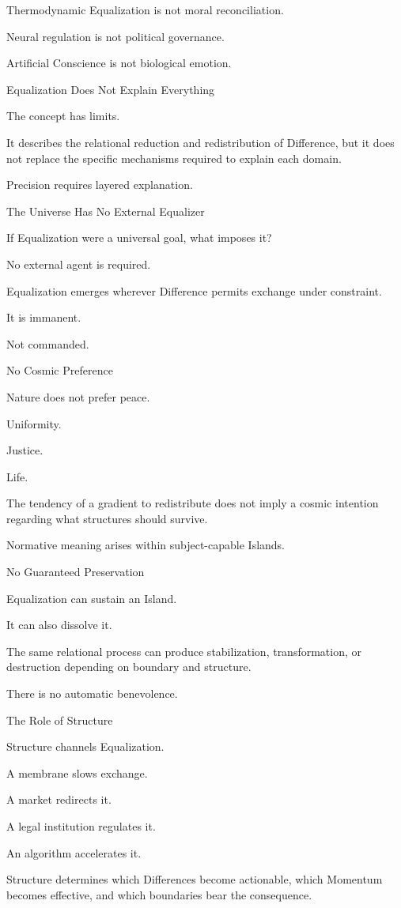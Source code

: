 Thermodynamic Equalization is not moral reconciliation.

Neural regulation is not political governance.

Artificial Conscience is not biological emotion.

Equalization Does Not Explain Everything

The concept has limits.

It describes the relational reduction and redistribution of Difference, but it does not replace the specific mechanisms required to explain each domain.

Precision requires layered explanation.

The Universe Has No External Equalizer

If Equalization were a universal goal, what imposes it?

No external agent is required.

Equalization emerges wherever Difference permits exchange under constraint.

It is immanent.

Not commanded.

No Cosmic Preference

Nature does not prefer peace.

Uniformity.

Justice.

Life.

The tendency of a gradient to redistribute does not imply a cosmic intention regarding what structures should survive.

Normative meaning arises within subject-capable Islands.

No Guaranteed Preservation

Equalization can sustain an Island.

It can also dissolve it.

The same relational process can produce stabilization, transformation, or destruction depending on boundary and structure.

There is no automatic benevolence.

The Role of Structure

Structure channels Equalization.

A membrane slows exchange.

A market redirects it.

A legal institution regulates it.

An algorithm accelerates it.

Structure determines which Differences become actionable, which Momentum becomes effective, and which boundaries bear the consequence.

